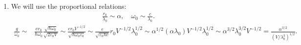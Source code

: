 \documentclass[letterpaper,11pt,twoside]{article}
\begin{document}
\begin{enumerate}[itemsep=0pt,topsep=0pt,parsep=0pt,label=\alph*)]
  \item We will use the proportional relations:
  \begin{align*}
    \frac{r_0}{\lambda_0}\sim\alpha,\quad\omega_0\sim\frac{c}{\lambda_0}.
  \end{align*}
  {\small
  \begin{align*}
    \frac{g}{\omega_0}\sim&\frac{er_0}{\hbar\omega_0}\frac{\sqrt{\hbar\omega_0}}{\sqrt{2\varepsilon_0V}}\sim\frac{er_0V^{-1/2}}{\sqrt{\hbar\omega_0\varepsilon_0}}\sim\frac{e}{\sqrt{\varepsilon_0\hbar c}}r_0V^{-1/2}\lambda_0^{1/2}\sim\alpha^{1/2}(\alpha\lambda_0)V^{-1/2}\lambda_0^{1/2}\sim\alpha^{3/2}\lambda_0^{3/2}V^{-1/2}=\frac{\alpha^{3/2}}{(V/\lambda_0^3)^{1/2}}.
  \end{align*}}
\end{enumerate}

%
\end{document}
